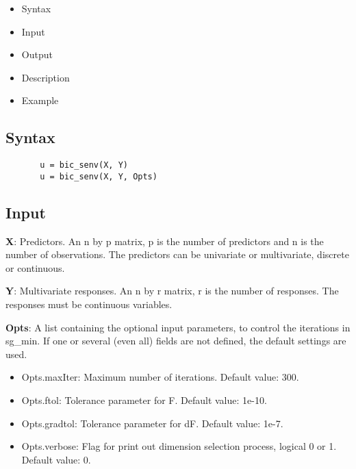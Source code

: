 \documentclass[a4paper,11pt,openany]{memoir}
\begin{document}
\begin{itemize}
\setlength{\itemsep}{-1ex}
   \item Syntax
   \item Input
   \item Output
   \item Description
   \item Example
\end{itemize}


\subsection*{Syntax}


\begin{verbatim}       u = bic_senv(X, Y)
       u = bic_senv(X, Y, Opts)\end{verbatim}
    

\subsection*{Input}

\begin{par}
\textbf{X}: Predictors. An n by p matrix, p is the number of predictors and n is the number of observations. The predictors can be univariate or multivariate, discrete or continuous.
\end{par} \vspace{1em}
\begin{par}
\textbf{Y}: Multivariate responses. An n by r matrix, r is the number of responses. The responses must be continuous variables.
\end{par} \vspace{1em}
\begin{par}
\textbf{Opts}: A list containing the optional input parameters, to control the iterations in sg\_min. If one or several (even all) fields are not defined, the default settings are used.
\end{par} \vspace{1em}
\begin{itemize}
\setlength{\itemsep}{-1ex}
   \item Opts.maxIter: Maximum number of iterations.  Default value: 300.
   \item Opts.ftol: Tolerance parameter for F.  Default value: 1e-10.
   \item Opts.gradtol: Tolerance parameter for dF.  Default value: 1e-7.
   \item Opts.verbose: Flag for print out dimension selection process, logical 0 or 1. Default value: 0.
\end{itemize}
\end{document}
